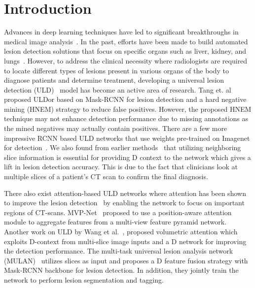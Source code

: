 \documentclass{bmvc2k}
\begin{document}
\section{Introduction}
\label{sec:intro}
Advances in deep learning techniques have led to significant breakthroughs in medical image analysis~\cite{litjens2017survey, meta-dermdiagnosis, ronneberger2015u, singh20203d}. In the past, efforts have been made to build automated lesion detection solutions that focus on specific organs such as liver, kidney, and lungs~\cite{liver_detect, kidney, pulm_nodule}. However, to address the clinical necessity where radiologists are required to locate different types of lesions present in various organs of the body to diagnose patients and determine treatment, developing a universal lesion detection (ULD)~\cite{zlocha2019universal, tang2019uldor, yan2019mulan, li2019mvp, 3dce} model has become an active area of research. Tang et. al~\cite{tang2019uldor} proposed ULDor based on Mask-RCNN for lesion detection and a hard negative mining (HNEM) strategy to reduce false positives. However, the proposed HNEM technique may not enhance detection performance due to missing annotations as the mined negatives may actually contain positives. There are a few more impressive RCNN based ULD networks that use weights pre-trained on Imagenet for detection~\cite{riblidetect, 3dce, yan2019mulan}. We also found from earlier methods~\cite{volumetric, 3dce} that utilizing neighboring slice information is essential for providing D context to the network which gives a lift in lesion detection accuracy. This is due to the fact that clinicians look at multiple slices of a patient's CT scan to confirm the final diagnosis. 

There also exist attention-based ULD networks where attention has been shown to improve the lesion detection~\cite{li2019mvp,3dce_improving, volumetric,retinanet_improv} by enabling the network to focus on important regions of CT-scans. MVP-Net~\cite{li2019mvp} proposed to use a position-aware attention module to aggregate features from a multi-view feature pyramid network. Another work on ULD by Wang et al.~\cite{volumetric}, proposed volumetric attention which exploits D-context from multi-slice image inputs and a D network for improving the detection performance. The multi-task universal lesion analysis network (MULAN)~\cite{yan2019mulan} utilizes  slices as input and proposes a D feature fusion strategy with Mask-RCNN backbone for lesion detection. In addition, they jointly train the network to perform lesion segmentation and tagging.
\end{document}
